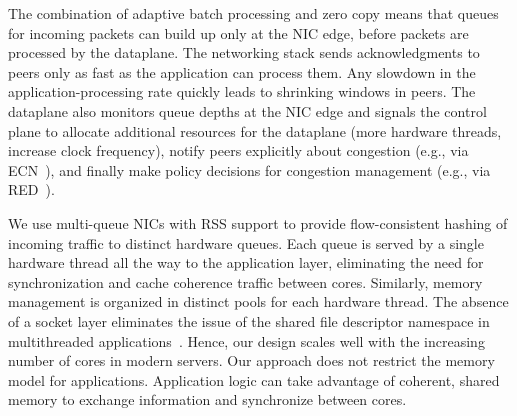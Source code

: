 The combination of adaptive batch processing and zero copy means that
queues for incoming packets can build up only at the NIC edge, before
packets are processed by the dataplane.  The networking stack sends
acknowledgments to peers only as fast as the application can process
them. Any slowdown in the application-processing rate quickly leads to
shrinking windows in peers. The dataplane also monitors queue
depths at the NIC edge and signals the control plane to allocate
additional resources for the dataplane (more hardware threads,
increase clock frequency), notify peers explicitly about congestion
(e.g., via ECN~\cite{ramakrishnan2001addition}), and finally make
policy decisions for congestion management (e.g., via
RED~\cite{DBLP:journals/ton/FloydJ93}).








 We use
multi-queue NICs with RSS support to provide flow-consistent hashing
of incoming traffic to distinct hardware queues. Each queue is served
by a single hardware thread all the way to the application layer,
eliminating the need for synchronization and cache coherence traffic
between cores. Similarly, memory management is organized in distinct
pools for each hardware thread. The absence of a socket layer
eliminates the issue of the shared file descriptor namespace in
multithreaded
applications~\cite{DBLP:conf/sosp/ClementsKZMK13}. Hence, our design
scales well with the increasing number of cores in modern servers. Our
approach does not restrict the memory model for
applications. Application logic can take advantage of coherent, shared
memory to exchange information and synchronize between cores.




